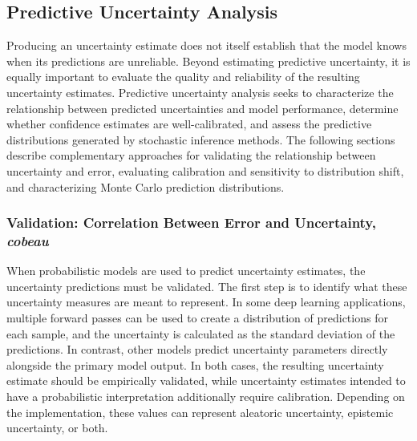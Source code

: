 \subsection{Predictive Uncertainty Analysis}
Producing an uncertainty estimate does not itself establish that the model knows when its predictions are unreliable. Beyond estimating predictive uncertainty, it is equally important to evaluate the quality and reliability of the resulting uncertainty estimates. Predictive uncertainty analysis seeks to characterize the relationship between predicted uncertainties and model performance, determine whether confidence estimates are well-calibrated, and assess the predictive distributions generated by stochastic inference methods. The following sections describe complementary approaches for validating the relationship between uncertainty and error, evaluating calibration and sensitivity to distribution shift, and characterizing Monte Carlo prediction distributions.

\subsubsection{Validation: Correlation Between Error and Uncertainty, \textit{cobeau}}
When probabilistic models are used to predict uncertainty estimates, the uncertainty predictions must be validated. The first step is to identify what these uncertainty measures are meant to represent. In some deep learning applications, multiple forward passes can be used to create a distribution of predictions for each sample, and the uncertainty is calculated as the standard deviation of the predictions. In contrast, other models predict uncertainty parameters directly alongside the primary model output. In both cases, the resulting uncertainty estimate should be empirically validated, while uncertainty estimates intended to have a probabilistic interpretation additionally require calibration. Depending on the implementation, these values can represent aleatoric uncertainty, epistemic uncertainty, or both.

